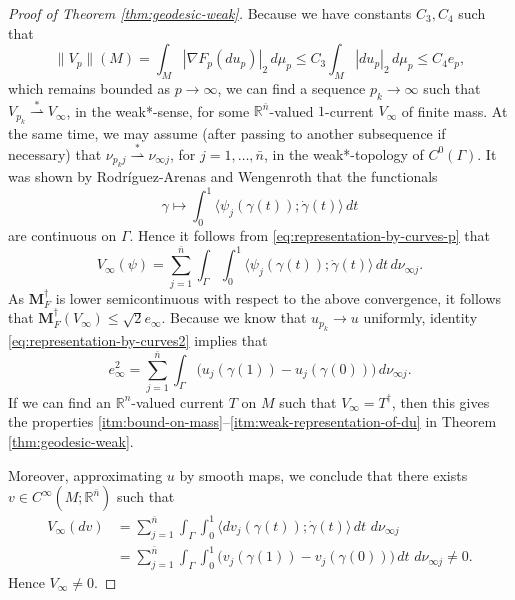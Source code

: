 \documentclass[a4paper]{article}
\newcommand{\R}{\mathbb{R}}
\newcommand{\M}{\mathbf{M}}
\newcommand{\ndim}{{\bar{n}}}
\newcommand{\pairing}[2]{\langle #1; #2 \rangle}
\theoremstyle{definition}
\theoremstyle{remark}
\begin{document}
\begin{proof}[Proof of Theorem \ref{thm:geodesic-weak}]
Because we have constants $C_3, C_4$ such that
\[
\|V_p\|(M) = \int_M |\nabla F_p(du_p)|_2 \, d\mu_p \le C_3 \int_M |du_p|_2 \, d\mu_p \le C_4 e_p,
\]
which remains bounded as $p \to \infty$, we can find a sequence $p_k \to \infty$ such that $V_{p_k} \stackrel{*}{\rightharpoonup} V_\infty$, in the weak*-sense, for
some $\R^\ndim$-valued $1$-current $V_\infty$ of finite mass. At the same time, we may assume (after passing to another subsequence if necessary) that $\nu_{p_k j} \stackrel{*}{\rightharpoonup} \nu_{\infty j}$, for $j = 1, \dotsc, \ndim$, in the weak*-topology of $C^0(\Gamma)$. It was shown by Rodr\'iguez-Arenas and Wengenroth \cite{Rodriguez-Arenas-Wengenroth:24} that the functionals
\[
\gamma \mapsto \int_0^1 \pairing{\psi_j(\gamma(t))}{\dot{\gamma}(t)} \, dt
\]
are continuous on $\Gamma$. Hence it follows from \eqref{eq:representation-by-curves-p} that
\[
V_\infty(\psi) = \sum_{j = 1}^\ndim \int_\Gamma \int_0^1 \pairing{\psi_j(\gamma(t))}{\dot{\gamma}(t)} \, dt \, d\nu_{\infty j}.
\]
As $\M_F^\dagger$ is lower semicontinuous with respect to the above convergence, it follows that $\M_F^\dagger(V_\infty) \le \sqrt{2} e_\infty$.
Because we know that $u_{p_k} \to u$ uniformly, identity \eqref{eq:representation-by-curves2} implies that
\[
e_\infty^2 = \sum_{j = 1}^\ndim \int_\Gamma \bigl(u_j(\gamma(1)) - u_j(\gamma(0))\bigr) \, d\nu_{\infty j}.
\]
If we can find an $\R^n$-valued current $T$ on $M$ such that $V_\infty = T^\dagger$, then this gives the properties \ref{itm:bound-on-mass}--\ref{itm:weak-representation-of-du} in Theorem \ref{thm:geodesic-weak}.

Moreover, approximating $u$ by smooth maps, we conclude that there exists
$v \in C^\infty(M; \R^\ndim)$ such that
\[
\begin{split}
V_\infty(dv) & = \sum_{j = 1}^\ndim \int_\Gamma \int_0^1 \pairing{dv_j(\gamma(t))}{\dot{\gamma}(t)} \, dt \, \, d\nu_{\infty j} \\
& = \sum_{j = 1}^\ndim \int_\Gamma \int_0^1 \bigl(v_j(\gamma(1)) - v_j(\gamma(0))\bigr) \, dt \, \, d\nu_{\infty j} \neq 0.
\end{split}
\]
Hence $V_\infty \neq 0$.


\end{proof}
\end{document}
